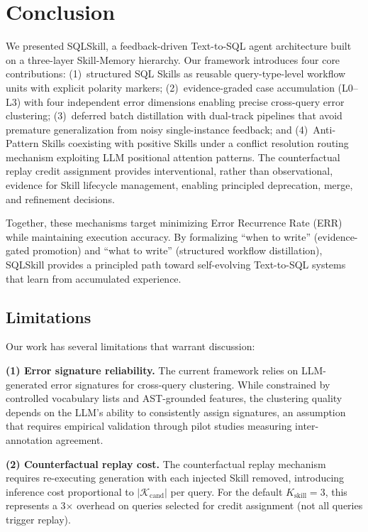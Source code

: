 
\section{Conclusion}
\label{sec:conclusion}

We presented SQLSkill, a feedback-driven Text-to-SQL agent architecture built on a three-layer Skill-Memory hierarchy. Our framework introduces four core contributions: (1)~structured SQL Skills as reusable query-type-level workflow units with explicit polarity markers; (2)~evidence-graded case accumulation (L0--L3) with four independent error dimensions enabling precise cross-query error clustering; (3)~deferred batch distillation with dual-track pipelines that avoid premature generalization from noisy single-instance feedback; and (4)~Anti-Pattern Skills coexisting with positive Skills under a conflict resolution routing mechanism exploiting LLM positional attention patterns. The counterfactual replay credit assignment provides interventional, rather than observational, evidence for Skill lifecycle management, enabling principled deprecation, merge, and refinement decisions.

Together, these mechanisms target minimizing Error Recurrence Rate (ERR) while maintaining execution accuracy. By formalizing ``when to write'' (evidence-gated promotion) and ``what to write'' (structured workflow distillation), SQLSkill provides a principled path toward self-evolving Text-to-SQL systems that learn from accumulated experience.

\subsection{Limitations}
\label{subsec:limitations}

Our work has several limitations that warrant discussion:

\textbf{(1) Error signature reliability.} The current framework relies on LLM-generated error signatures for cross-query clustering. While constrained by controlled vocabulary lists and AST-grounded features, the clustering quality depends on the LLM's ability to consistently assign signatures, an assumption that requires empirical validation through pilot studies measuring inter-annotation agreement.

\textbf{(2) Counterfactual replay cost.} The counterfactual replay mechanism requires re-executing generation with each injected Skill removed, introducing inference cost proportional to $|\mathcal{K}_{\text{cand}}|$ per query. For the default $K_{\text{skill}}=3$, this represents a 3$\times$ overhead on queries selected for credit assignment (not all queries trigger replay).

